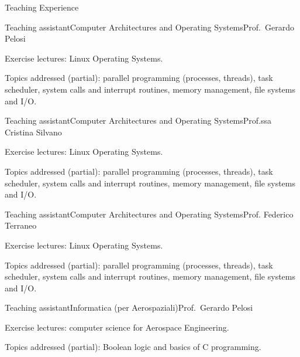 \documentclass[
	a4paper, %
	11pt, %
]{resume} %
\begin{document}
\begin{rSection}{Teaching Experience}
  \begin{rSubsection}{Teaching assistant}{}{Computer Architectures and Operating Systems}{Prof.\ Gerardo Pelosi}
  \item Exercise lectures: Linux Operating Systems.
  \item Topics addressed (partial): parallel programming (processes, threads),
    task scheduler, system calls and interrupt routines, memory management, file
    systems and I/O.
  \end{rSubsection}
  \begin{rSubsection}{Teaching assistant}{}{Computer Architectures and
      Operating Systems}{Prof.ssa Cristina Silvano }
  \item Exercise lectures: Linux Operating Systems.
  \item Topics addressed (partial): parallel programming (processes, threads),
    task scheduler, system calls and interrupt routines, memory management, file
    systems and I/O.
  \end{rSubsection}
  \begin{rSubsection}{Teaching assistant}{}{Computer Architectures and
      Operating Systems}{Prof. Federico Terraneo }
  \item Exercise lectures: Linux Operating Systems.
  \item Topics addressed (partial): parallel programming (processes, threads),
    task scheduler, system calls and interrupt routines, memory management, file
    systems and I/O.
  \end{rSubsection}
  \begin{rSubsection}{Teaching assistant}{}{Informatica (per Aerospaziali)}{Prof.\ Gerardo Pelosi}
  \item Exercise lectures: computer science for Aerospace Engineering.
  \item Topics addressed (partial): Boolean logic and basics of C programming.
  \end{rSubsection}

\end{rSection}
\end{document}
